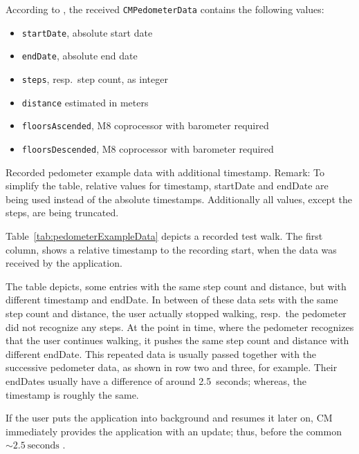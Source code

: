 According to \citet{apple:ios_doc_cm}, the received \texttt{CMPedometerData} contains the following values:
\begin{itemize}
  \item \texttt{startDate}, absolute start date
  \item \texttt{endDate}, absolute end date
  \item \texttt{steps}, resp.\ step count, as integer
  \item \texttt{distance} estimated in meters
  \item \texttt{floorsAscended}, M8 coprocessor with barometer required
  \item \texttt{floorsDescended}, M8 coprocessor with barometer required
\end{itemize}

\begin{table}
	
	\caption{Recorded pedometer example data with additional timestamp. Remark: To simplify the table, relative values for timestamp, startDate and endDate are being used instead of the absolute timestamps. Additionally all values, except the steps, are being truncated.}
	\label{tab:pedometerExampleData}
\end{table}


Table~\ref{tab:pedometerExampleData} depicts a recorded test walk. The first column, shows a relative timestamp to the recording start, when the data was received by the application.

The table depicts, some entries with the same step count and distance, but with different timestamp and endDate. In between of these data sets with the same step count and distance, the user actually stopped walking, resp.\ the pedometer did not recognize any steps. At the point in time, where the pedometer recognizes that the user continues walking, it pushes the same step count and distance with different endDate. This repeated data is usually passed together with the successive pedometer data, as shown in row two and three, for example. Their endDates usually have a difference of around 2.5~seconds; whereas, the timestamp is roughly the same.

If the user puts the application into background and resumes it later on, \ac{CM} immediately provides the application with an update; thus, before the common $\sim 2.5~\text{seconds}$ \citep{apple:wwdc_2014_pham}.


